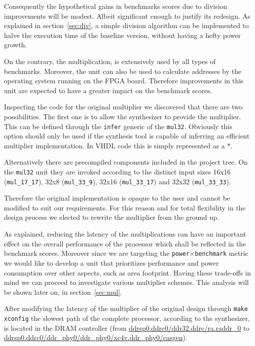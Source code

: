 Consequently the hypothetical gains in benchmarks scores due to division improvements will be modest. Albeit significant enough to justify its redesign. As explained in section~\ref{sec:div}, a simple division algorithm can be implemented to halve the execution time of the baseline version, without having a hefty power growth.

On the contrary, the multiplication, is extensively used by all types of benchmarks. Moreover, the unit can also be used to calculate addresses by the operating system running on the FPGA board. Therefore improvements in this unit are expected to have a greater impact on the benchmark scores. 

Inspecting the code for the original multiplier we discovered that there are two possibilities. The first one is to allow the synthesizer to provide the multiplier. This can be defined through the \texttt{infer} generic of the \texttt{mul32}. Obviously this option should only be used if the synthesis tool is capable of inferring an efficient multiplier implementation. In VHDL code this is simply represented as a $*$.

Alternatively there are precompiled components included in the project tree. On the \texttt{mul32} unit they are invoked according to the distinct input sizes 16x16 (\texttt{mul\_17\_17}), 32x8 (\texttt{mul\_33\_9}), 32x16 (\texttt{mul\_33\_17}) and 32x32 (\texttt{mul\_33\_33}).

Therefore the original implementation is opaque to the user and cannot be modified to suit our requirements. For this reason and for total flexibility in the design process we elected to rewrite the multiplier from the ground up.

As explained, reducing the latency of the multiplications can have an important effect on the overall performance of the processor which shall be reflected in the benchmark scores. Moreover since we are targeting the \texttt{power$\times$benchmark} metric we would like to develop a unit that prioritizes performance and power consumption over other aspects, such as area footprint. Having these trade-offs in mind we can proceed to investigate various multiplier schemes. This analysis will be shown later on, in section~\ref{sec:mul}.

After modifying the latency of the multiplier of the original design through \texttt{make xconfig} the slowest path of the complete processor, according to the synthesizer, is located in the DRAM controller (from \url{ddrsp0.ddrc0/ddr32.ddrc/ra.raddr_0} to \url{ddrsp0.ddrc0/ddr_phy0/ddr_phy0/xc4v.ddr_phy0/casgen}).

